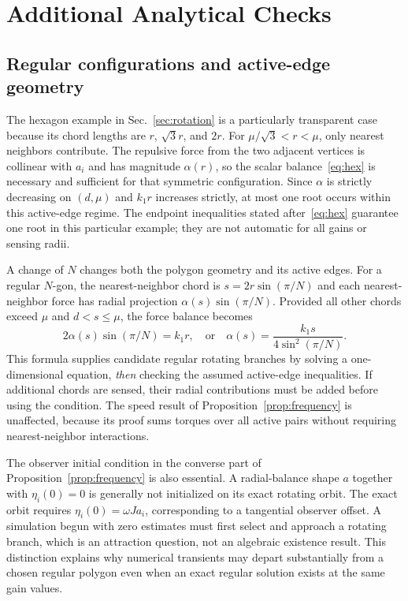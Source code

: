 \documentclass[conference]{IEEEtran}
\begin{document}
\section{Additional Analytical Checks}
\label{sec:checks}
\subsection{Regular configurations and active-edge geometry}
The hexagon example in Sec.~\ref{sec:rotation} is a particularly transparent case because its chord lengths are $r$, $\sqrt3r$, and $2r$. For $\mu/\sqrt3<r<\mu$, only nearest neighbors contribute. The repulsive force from the two adjacent vertices is collinear with $a_i$ and has magnitude $\alpha(r)$, so the scalar balance~\eqref{eq:hex} is necessary and sufficient for that symmetric configuration. Since $\alpha$ is strictly decreasing on $(d,\mu)$ and $k_1r$ increases strictly, at most one root occurs within this active-edge regime. The endpoint inequalities stated after~\eqref{eq:hex} guarantee one root in this particular example; they are not automatic for all gains or sensing radii.

A change of $N$ changes both the polygon geometry and its active edges. For a regular $N$-gon, the nearest-neighbor chord is $s=2r\sin(\pi/N)$ and each nearest-neighbor force has radial projection $\alpha(s)\sin(\pi/N)$. Provided all other chords exceed $\mu$ and $d<s\leq\mu$, the force balance becomes
\begin{equation}
 2\alpha(s)\sin(\pi/N)=k_1r,
 \quad\text{or}\quad
 \alpha(s)=\frac{k_1s}{4\sin^2(\pi/N)}.
 \label{eq:polygon}
\end{equation}
This formula supplies candidate regular rotating branches by solving a one-dimensional equation, \emph{then} checking the assumed active-edge inequalities. If additional chords are sensed, their radial contributions must be added before using the condition. The speed result of Proposition~\ref{prop:frequency} is unaffected, because its proof sums torques over all active pairs without requiring nearest-neighbor interactions.

The observer initial condition in the converse part of Proposition~\ref{prop:frequency} is also essential. A radial-balance shape $a$ together with $\eta_i(0)=0$ is generally not initialized on its exact rotating orbit. The exact orbit requires $\eta_i(0)=\omega Ja_i$, corresponding to a tangential observer offset. A simulation begun with zero estimates must first select and approach a rotating branch, which is an attraction question, not an algebraic existence result. This distinction explains why numerical transients may depart substantially from a chosen regular polygon even when an exact regular solution exists at the same gain values.
\end{document}
